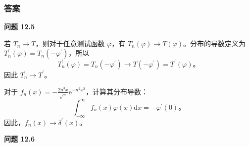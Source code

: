\subsubsection*{答案}

\textbf{问题 12.5}

若 $T_n \to T$，则对于任意测试函数 $\varphi$，有
$T_n(\varphi) \to T(\varphi)$。分布的导数定义为
$T_n^{\prime}(\varphi) = T_n(-\varphi^{\prime})$，所以
 $$
T_n^{\prime}(\varphi) = T_n(-\varphi^{\prime}) \to T(-\varphi^{\prime}) = T^{\prime}(\varphi)。
$$
因此 $T_n^{\prime} \to T^{\prime}$。

对于
$f_n(x) = -\frac{2 n^3 x}{\sqrt{\pi}} \mathrm{e}^{-n^2 x^2}$，计算其分布导数：
 $$
\int_{-\infty}^\infty f_n(x) \varphi(x) \mathrm{d}x = -\varphi^{\prime}(0)。
$$
因此，$f_n(x) \to \delta^{\prime}(x)$。


\textbf{问题 12.6}

